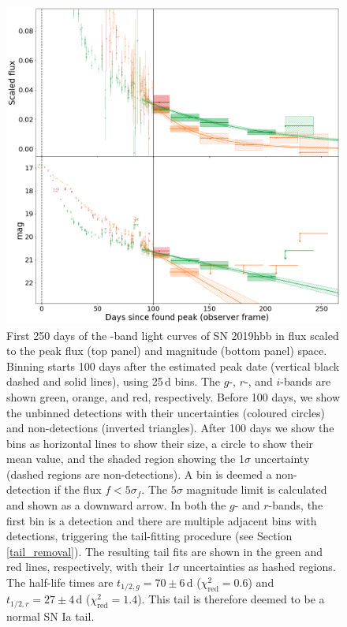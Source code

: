 \documentclass[a4paper,oneside,12pt, class=Latex/Classes/PhDthesisPSnPDF, crop=false]{standalone}
\begin{document}
\begin{figure}
 \centering
 \includegraphics[width=\textwidth]{../Images/chapter_3/bin_showcase.png}
 \caption{First 250 days of the \ztfg\ztfr\ztfi-band light curves of SN 2019hbb in flux scaled to the peak flux (top panel) and magnitude (bottom panel) space. Binning starts 100 days after the estimated peak date (vertical black dashed and solid lines), using 25\,d bins. The $g$-, $r$-, and $i$-bands are shown green, orange, and red, respectively. Before 100 days, we show the unbinned detections with their uncertainties (coloured circles) and non-detections (inverted triangles). After 100 days we show the bins as horizontal lines to show their size, a circle to show their mean value, and the shaded region showing the 1$\sigma$ uncertainty (dashed regions are non-detections). A bin is deemed a non-detection if the flux $f<5\sigma_f$. The $5\sigma$ magnitude limit is calculated and shown as a downward arrow. In both the $g$- and $r$-bands, the first bin is a detection and there are multiple adjacent bins with detections, triggering the tail-fitting procedure (see Section \ref{tail_removal}). The resulting tail fits are shown in the green and red lines, respectively, with their 1$\sigma$ uncertainties as hashed regions. The half-life times are $t_{1/2,g} = 70 \pm 6$\,d ($\chi^2_\text{red} = 0.6$) and $t_{1/2,r} = 27 \pm 4$\,d ($\chi^2_\text{red} = 1.4$). This tail is therefore deemed to be a normal SN Ia tail.}
 \label{bin_showcase}
\end{figure}
\end{document}
